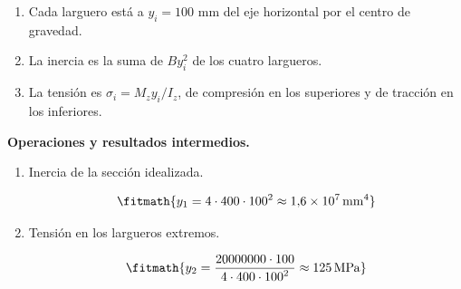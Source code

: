 \begin{enumerate}

\item Cada larguero está a $y_i = 100$ mm del eje horizontal por el centro de gravedad.

\item La inercia es la suma de $B y_i^2$ de los cuatro largueros.

\item La tensión es $\sigma_i = M_z y_i/I_z$, de compresión en los superiores y de tracción en los inferiores.

\end{enumerate}

\noindent\textbf{Operaciones y resultados intermedios.}

\begin{enumerate}

\item Inercia de la sección idealizada.

\[\fitmath{y_{1}=4\cdot 400\cdot {100}^{2}\approx 1{,}6\times10^{7}\,\mathrm{mm^{4}}}\]

\item Tensión en los largueros extremos.

\[\fitmath{y_{2}=\frac{20000000\cdot 100}{4\cdot 400\cdot {100}^{2}}\approx 125\,\mathrm{MPa}}\]

\end{enumerate}
